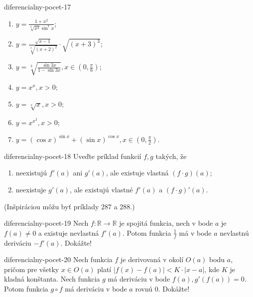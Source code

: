 \begin{defproblem}{diferencialny-pocet-17}
\begin{enumerate}
    \item $y=\frac{1+x^2}{\sqrt[3]{x^4}\sin^7 x}$;
    \item $y=\frac{\sqrt{x-1}}{\sqrt[3]{(x+2)^2}}\cdot\sqrt{(x+3)^3}$;
    \item $y=\sqrt[3]{\frac{\sin 3x}{1-\sin 3x}},x\in(0,\frac{\pi}{6})$;
    \item $y=x^x,x>0$;
    \item $y=\sqrt[x]{x},x>0$;
    \item $y=x^{x^2},x>0$;
    \item $y=(\cos x)^{\sin x}+(\sin x)^{\cos x},x\in(0,\frac{\pi}{2})$.
\end{enumerate}
\end{defproblem}

\begin{defproblem}{diferencialny-pocet-18}
Uveďte príklad funkcií $f,g$ takých, že
\begin{enumerate}
\item neexistujú $f'(a)$ ani $g'(a)$, ale existuje vlastná $(f\cdot g)(a)$;
\item neexistuje $g'(a)$, ale existujú vlastné $f'(a)$ a $(f\cdot g)'(a)$.
\end{enumerate}
(Inšpiráciou môžu byť príklady $287$ a $288$.)
\end{defproblem}

\begin{defproblem}{diferencialny-pocet-19}
Nech $f:\mathbb{R}\rightarrow\mathbb{R}$ je spojitá funkcia, nech v bode $a$ je $f(a)\neq 0$ a existuje nevlastná $f'(a)$. Potom funkcia $\frac{1}{f}$ má v bode $a$ nevlastnú deriváciu $-f'(a)$. Dokážte!
\end{defproblem}

\begin{defproblem}{diferencialny-pocet-20}
Nech funkcia $f$ je derivovaná v okolí $O(a)$ bodu $a$, pričom pre všetky $x\in O(a)$ platí $|f(x)-f(a)|<K\cdot |x-a|$, kde $K$ je kladná konštanta. Nech funkcia $g$ má deriváciu v bode $f(a),g'(f(a))=0$. Potom funkcia $g \circ f$ má deriváciu v bode $a$ rovnú $0$. Dokážte!
\end{defproblem}

